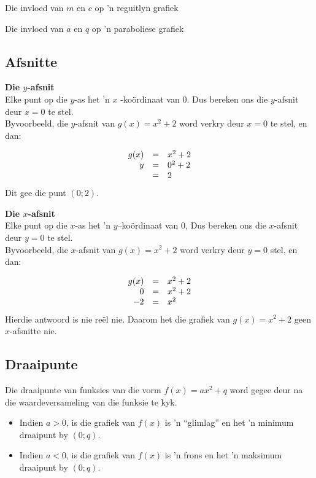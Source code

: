 \begin{Ondersoek}{Die invloed van $m$ en $c$ op 'n reguitlyn grafiek}
\begin{Ondersoek}{Die invloed van $a$ en $q$ op 'n paraboliese grafiek}
\subsection*{Afsnitte}
\textbf{Die $y$-afsnit}\\
Elke punt op die $y$-as het 'n $x$ -ko\"ordinaat van $0$. Dus bereken ons die $y$-afsnit deur $x = 0$ te stel.\\

Byvoorbeeld, die $y$-afsnit van $g(x)={x}^{2}+2$ word verkry deur $x=0$ te stel, en dan:\par 

\begin{equation*}
\begin{array}{ccl}\hfill g(x)& =& {x}^{2}+2\hfill \\ 
\hfill {y}& =& {0}^{2}+2\hfill \\
 & =& 2\hfill 
\end{array}
\end{equation*}
Dit gee die punt $(0;2)$.\par

\textbf{Die $x$-afsnit}\\
Elke punt op die $x$-as het 'n $y$--ko\"ordinaat van $0$, Dus bereken ons die $x$-afsnit deur $y=0$ te stel.\\

Byvoorbeeld, die $x$-afsnit van $g(x)={x}^{2}+2$ word verkry deur $y=0$ stel, en dan:\par

\begin{equation*}
\begin{array}{ccl}\hfill g(x)& =& {x}^{2}+2\hfill \\
 \hfill 0& =& x^{2}+2\hfill \\
 \hfill -2& =& x^{2}\hfill 
\end{array}
\end{equation*}
Hierdie antwoord is nie reël nie. Daarom het die grafiek van $g(x)={x}^{2}+2$ geen $x$-afsnitte nie. 

\subsection*{Draaipunte}

Die draaipunte van funksies van die vorm $f(x)=ax^{2}+q$ word gegee deur na die waardeversameling van
die funksie te kyk. 
\begin{itemize}
 \item Indien $a>0$, is die grafiek van $f(x)$ is 'n ``glimlag'' en het 'n minimum draaipunt by $(0;q)$.
\item Indien $a<0$, is die grafiek van $f(x)$ is 'n frons en het 'n maksimum
draaipunt by $(0;q)$.
\end{itemize}



\end{Ondersoek}
\end{Ondersoek}
